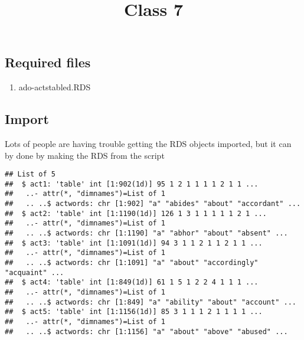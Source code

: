 \documentclass[
]{article}
\title{Class 7}
\author{}
\date{\vspace{-2.5em}}
\newenvironment{Shaded}{\begin{snugshade}}{\end{snugshade}}
\newcommand{\DataTypeTok}[1]{\textcolor[rgb]{0.13,0.29,0.53}{#1}}
\newcommand{\KeywordTok}[1]{\textcolor[rgb]{0.13,0.29,0.53}{\textbf{#1}}}
\newcommand{\NormalTok}[1]{#1}
\newcommand{\OperatorTok}[1]{\textcolor[rgb]{0.81,0.36,0.00}{\textbf{#1}}}
\newcommand{\OtherTok}[1]{\textcolor[rgb]{0.56,0.35,0.01}{#1}}
\newcommand{\StringTok}[1]{\textcolor[rgb]{0.31,0.60,0.02}{#1}}
\providecommand{\tightlist}{%
  \setlength{\itemsep}{0pt}\setlength{\parskip}{0pt}}
\begin{document}
\maketitle

\hypertarget{required-files}{%
\subsection{Required files}\label{required-files}}

\begin{enumerate}
\def\labelenumi{\arabic{enumi}.}
\tightlist
\item
  ado-actstabled.RDS
\end{enumerate}

\hypertarget{import}{%
\subsection{Import}\label{import}}

Lots of people are having trouble getting the RDS objects imported, but
it can by done by making the RDS from the script

\begin{Shaded}
\end{Shaded}

\begin{verbatim}
## List of 5
##  $ act1: 'table' int [1:902(1d)] 95 1 2 1 1 1 1 2 1 1 ...
##   ..- attr(*, "dimnames")=List of 1
##   .. ..$ actwords: chr [1:902] "a" "abides" "about" "accordant" ...
##  $ act2: 'table' int [1:1190(1d)] 126 1 3 1 1 1 1 1 2 1 ...
##   ..- attr(*, "dimnames")=List of 1
##   .. ..$ actwords: chr [1:1190] "a" "abhor" "about" "absent" ...
##  $ act3: 'table' int [1:1091(1d)] 94 3 1 1 2 1 1 2 1 1 ...
##   ..- attr(*, "dimnames")=List of 1
##   .. ..$ actwords: chr [1:1091] "a" "about" "accordingly" "acquaint" ...
##  $ act4: 'table' int [1:849(1d)] 61 1 5 1 2 2 4 1 1 1 ...
##   ..- attr(*, "dimnames")=List of 1
##   .. ..$ actwords: chr [1:849] "a" "ability" "about" "account" ...
##  $ act5: 'table' int [1:1156(1d)] 85 3 1 1 1 2 1 1 1 1 ...
##   ..- attr(*, "dimnames")=List of 1
##   .. ..$ actwords: chr [1:1156] "a" "about" "above" "abused" ...
\end{verbatim}
\end{document}
